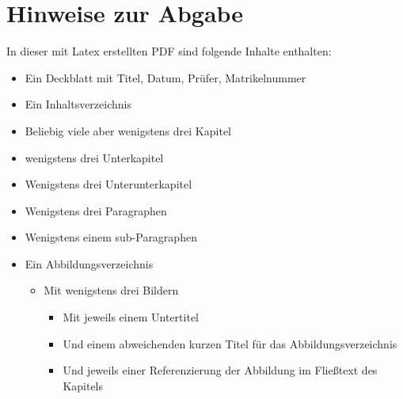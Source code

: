 \section*{Hinweise zur Abgabe}

In dieser mit Latex erstellten PDF sind folgende Inhalte enthalten: 

\begin{itemize}
    \item Ein Deckblatt mit Titel, Datum, Prüfer, Matrikelnummer                                
    \item Ein Inhaltsverzeichnis                                                                
    \item Beliebig viele aber wenigstens drei Kapitel                                           
    \item wenigstens drei Unterkapitel                                                          
    \item Wenigstens drei Unterunterkapitel                                                     
    \item Wenigstens drei Paragraphen                                                           
    \item Wenigstens einem sub-Paragraphen                                                      
    \item Ein Abbildungsverzeichnis                                                             
    \begin{itemize}                                                                             
        \item Mit wenigstens drei Bildern                                                       
        \begin{itemize}                                                                         
            \item Mit jeweils einem Untertitel                                                  
            \item Und einem abweichenden kurzen Titel für das Abbildungsverzeichnis             
            \item Und jeweils einer Referenzierung der Abbildung im Fließtext des Kapitels      
        \end{itemize}                                                                           
    \end{itemize}                                                                               

\end{itemize}
